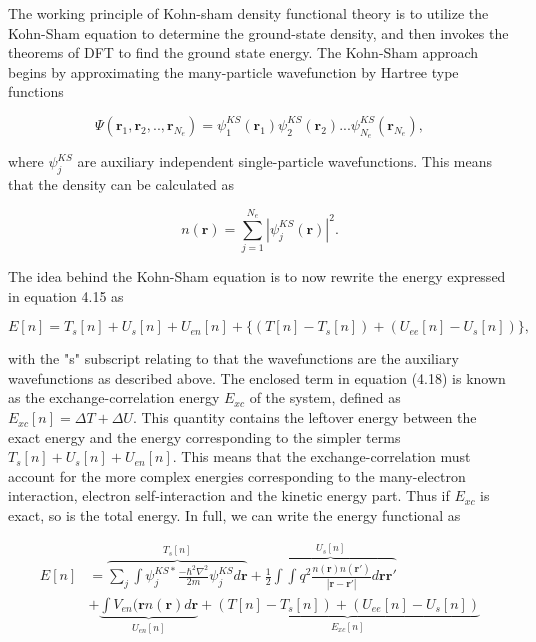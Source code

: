 The working principle of Kohn-sham density functional theory is to utilize the Kohn-Sham equation to determine the ground-state density, and then invokes the theorems of DFT to find the ground state energy. The Kohn-Sham approach begins by approximating the many-particle wavefunction by Hartree type functions

\begin{equation}
    \Psi(\boldsymbol{r}_1, \boldsymbol{r}_2 , .., \boldsymbol{r}_{N_e}) = \psi_1^{KS}(\boldsymbol{r}_1)\psi_2^{KS}(\boldsymbol{r}_2)...\psi_{N_e}^{KS}(\boldsymbol{r}_{N_e}), 
\end{equation}

where $\psi_j^{KS}$ are auxiliary independent single-particle wavefunctions. This means that the density can be calculated as

\begin{equation}
n(\boldsymbol{r}) = \sum_{j=1}^{N_e} |\psi_{j}^{KS}(\boldsymbol{r})|^2.
\end{equation} 

The idea behind the Kohn-Sham equation is to now rewrite the energy expressed in equation 4.15 as

\begin{equation}
    E[n] = T_s[n] + U_s[n] + U_{en}[n] + \bigg\{(T[n] - T_s[n]) + (U_{ee}[n] - U_s[n]) \bigg\}, 
\end{equation}

with the "s" subscript relating to that the wavefunctions are the auxiliary wavefunctions as described above. The enclosed term in equation (4.18) is known as the exchange-correlation energy $E_{xc}$ of the system, defined as $E_{xc}[n] = \Delta T + \Delta U$. This quantity contains the leftover energy between the exact energy and the energy corresponding to the simpler terms $T_s[n] + U_s[n] + U_{en}[n]$. This means that the exchange-correlation must account for the more complex energies corresponding to the many-electron interaction, electron self-interaction and the kinetic energy part. Thus if $E_{xc}$ is exact, so is the total energy. In full, we can write the energy functional as

\begin{equation}
    \begin{split}
    E[n] &= \overbrace{\sum_j \int \psi_j^{KS*}\frac{-\hbar^2 \nabla^2}{2m}\psi_j^{KS}d\boldsymbol{r}}^{T_s[n]} + \overbrace{\frac{1}{2} \int \int q^2 \frac{n(\boldsymbol{r})n(\boldsymbol{r}')}{|\boldsymbol{r} - \boldsymbol{r}'|}d\boldsymbol{r}\boldsymbol{r}'}^{U_s[n]} \\ 
        &+ \underbrace{\int V_{en}(\boldsymbol{r}n(\boldsymbol{r})d\boldsymbol{r}}_{U_{en}[n]} + \underbrace{(T[n] - T_s[n]) + (U_{ee}[n] - U_s[n])}_{E_{xc}[n]}
    \end{split}
\end{equation}


